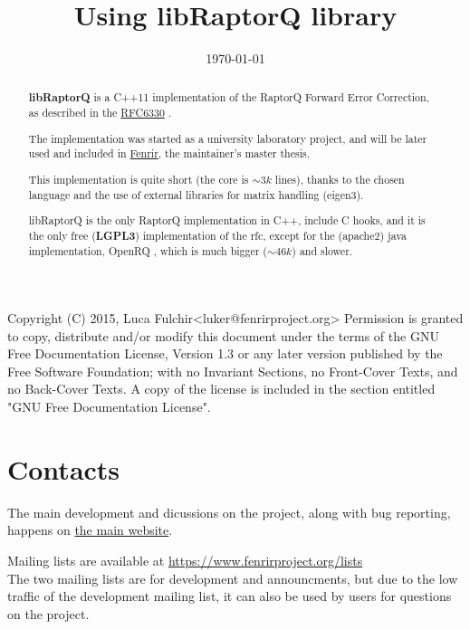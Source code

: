 \documentclass[11pt,a4paper]{refart}
\title{Using libRaptorQ library}
\date{\today}
\begin{document}
\maketitle

\begin{abstract}

\textbf{libRaptorQ} is a C++11 implementation of the RaptorQ Forward Error Correction, as described in the \href{https://tools.ietf.org/html/rfc6330}{RFC6330} .

The implementation was started as a university laboratory project, and will be later used and included in \href{https://www.fenrirproject.org}{Fenrir}, the
maintainer's master thesis.

This implementation is quite short (the core is $\sim3k$ lines), thanks to the chosen language and the use of external libraries for matrix handling (eigen3).

libRaptorQ is the only RaptorQ implementation in C++, include C hooks, and it is the only free (\textbf{LGPL3}) implementation of the rfc, except for the (apache2)
java implementation, OpenRQ , which is much bigger ($\sim 46k$) and slower.
\end{abstract}

\vfill\hfill
\begin{verbbox}[\tiny]
Copyright (C)  2015, Luca Fulchir<luker@fenrirproject.org>
Permission is granted to copy, distribute and/or modify this document
under the terms of the GNU Free Documentation License, Version 1.3
or any later version published by the Free Software Foundation;
with no Invariant Sections, no Front-Cover Texts, and no Back-Cover Texts.
A copy of the license is included in the section entitled "GNU
Free Documentation License".
\end{verbbox}
\theverbbox

\newpage
\tableofcontents
\newpage


\section{Contacts}

The main development and dicussions on the project, along with bug reporting, happens on
\href{https://www.fenrirproject.org/projects/libraptorq/}{the main website}.

 Mailing lists are available at \href{https://www.fenrirproject.org/lists}{https://www.fenrirproject.org/lists}\\
The two mailing lists are for development and announcments, but due to the low traffic of the development mailing list, it
can also be used by users for questions on the project.
\end{document}
